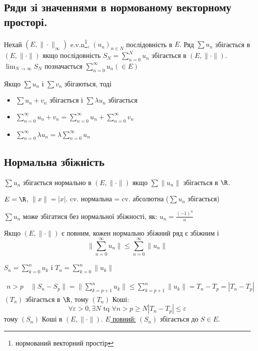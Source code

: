 \subsection{Ряди зі значеннями в нормованому векторному просторі.}
\begin{definition}
     Нехай $(E, \| \cdot \|_{\infty})$ e.v.n\footnote{нормований векторний простір}, $(u_n)_{n \in N}$ послідовність в $E$. Ряд $\sum u_n$ збігається в $(E, \| \cdot \|)$ якщо послідовність $S_N = \sum_{n=0}^{N} u_n$ збігається в $(E, \| \cdot \|)$. $\lim_{N \to \infty} S_N$ позначається $\sum_{n=0}^{\infty} u_n (\in E)$
\end{definition}
\begin{remark}
   Якщо $\sum u_n$ і $\sum v_n$ збігаються, тоді
   \begin{itemize}
       \item $\sum u_n + v_n$ збігається і $\sum \lambda u_n$ збігається
       \item $\sum_{n=0}^{\infty} u_n + v_n = \sum_{n=0}^{\infty} u_n + \sum_{n=0}^{\infty} v_n$ 
       \item $\sum_{n=0}^{\infty} \lambda u_n = \lambda \sum_{n=0}^{\infty} u_n$
   \end{itemize}
\end{remark}

\subsection{Нормальна збіжність}
\begin{definition}
   $\sum u_n$ збігається нормально в $(E, \| \cdot \|)$ якщо $\sum \|u_n\|$ збігається в $\R$. 
\end{definition}
\begin{eg}
   $E = \R$, $\|x\| = |x|$. cv. нормальна = cv. абсолютна ($\sum u_n$ збігається) 
\end{eg}
\begin{eg}
   $\sum u_n$ може збігатися без нормальної збіжності, як: $u_n = \frac{(-1)^n}{n}$ 
\end{eg}

\begin{theorem}
    Якщо $(E, \| \cdot \|)$ є повним, кожен нормально збіжний ряд є збіжним і
     \[
    \|\sum_{n=0}^{\infty} u_n\| \le \sum_{n=0}^{\infty} \|u_n\|
    \] 
\end{theorem}
\begin{preuve}
   $S_n = \sum_{k=0}^{n} u_k$ і $T_n = \sum_{k=0}^{n} \|u_k\|$ 

   \begin{align*}
       n > p \quad \|S_n - S_p\| = \|\sum_{k = p+1}^{n} u_k\| \le \sum_{k=p+1}^{n} \|u_k\| = T_n - T_p = |T_n - T_p|
   \end{align*}
    $(T_n)$ збігається в $\R$, тому $(T_n)$ Коші:
     \[
    \forall \varepsilon > 0, \exists N \text{ tq } \forall n > p \ge N |T_n - T_p| \le \varepsilon
    \] 
    тому $(S_n)$ Коші в $(E, \| \cdot \|)$. \underline{$E$ повний:} $(S_n)$ збігається до $S \in E$.
\end{preuve}
